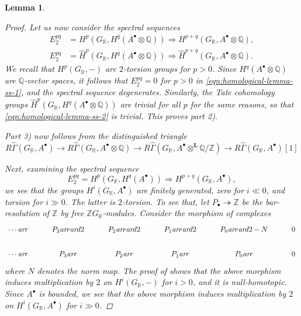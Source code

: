 \documentclass[leqno,12pt]{article}
\theoremstyle{plain}
\newtheorem{lemma}[theorem]{\indent\sc Lemma}
\theoremstyle{definition}
\newcommand{\QQ}{\mathbb{Q}}
\newcommand{\RR}{\mathbb{R}}
\newcommand{\ZZ}{\mathbb{Z}}
\newcommand{\ar}{\text{\it ar}}
\begin{document}
\begin{lemma}
\begin{proof}
    Let us now consider the spectral sequences
    \begin{align}
      \label{eqn:homological-lemma-ss-1} E_2^{pq} & = H^p (G_\RR, H^q (A^\bullet \otimes \QQ)) \Longrightarrow H^{p+q} (G_\RR, A^\bullet \otimes \QQ), \\
      \label{eqn:homological-lemma-ss-2} E_2^{pq} & = \widehat{H}^p (G_\RR, H^q (A^\bullet \otimes \QQ)) \Longrightarrow \widehat{H}^{p+q} (G_\RR, A^\bullet \otimes \QQ).
    \end{align}
    We recall that $H^p (G_\RR, -)$ are $2$-torsion groups for $p > 0$. Since
    $H^q (A^\bullet \otimes \QQ)$ are $\QQ$-vector spaces, it follows that
    $E_2^{pq} = 0$ for $p > 0$ in \eqref{eqn:homological-lemma-ss-1}, and the
    spectral sequence degenerates. Similarly, the Tate cohomology groups
    $\widehat{H}^p (G_\RR, H^q (A^\bullet \otimes \QQ))$ are trivial for
    \emph{all} $p$ for the same reasons, so that
    \eqref{eqn:homological-lemma-ss-2} is trivial. This proves part 2).

    Part 3) now follows from the distinguished triangle
    \[ R\widehat{\Gamma} (G_\RR, A^\bullet) \to
      R\widehat{\Gamma} (G_\RR, A^\bullet \otimes \QQ) \to
      R\widehat{\Gamma} (G_\RR, A^\bullet \otimes^\mathbf{L} \QQ/\ZZ) \to
      R\widehat{\Gamma} (G_\RR, A^\bullet) [1] \]

    Next, examining the spectral sequence
    $$E_2^{pq} = H^p (G_\RR, H^q (A^\bullet)) \Longrightarrow H^{p+q} (G_\RR, A^\bullet),$$
    we see that the groups $H^i (G_\RR, A^\bullet)$ are finitely generated, zero
    for $i \ll 0$, and torsion for $i \gg 0$. The latter is $2$-torsion. To see
    that, let $P_\bullet \twoheadrightarrow \ZZ$ be the bar-resolution of $\ZZ$
    by free $\ZZ G_\RR$-modules. Consider the morphism of complexes
    \[ \begin{tikzcd}
        \cdots\ar{r} & P_3\ar{r}\ar{d}{2} & P_2\ar{r}\ar{d}{2} & P_1\ar{r}\ar{d}{2} & P_0\ar{r}\ar{d}{2-N} & 0 \\
        \cdots\ar{r} & P_3\ar{r} & P_2\ar{r} & P_1\ar{r} & P_0\ar{r} & 0
      \end{tikzcd} \]
    where $N$ denotes the norm map. The proof of
    \cite[Theorem~6.5.8]{Weibel-1994} shows that the above morphism induces
    multiplication by $2$ on $H^i (G_\RR,-)$ for $i > 0$, and it is
    null-homotopic. Since $A^\bullet$ is bounded, we see that the above morphism
    induces multiplication by $2$ on $H^i (G_\RR, A^\bullet)$ for $i \gg 0$.


\end{proof}
\end{lemma}
\end{document}
